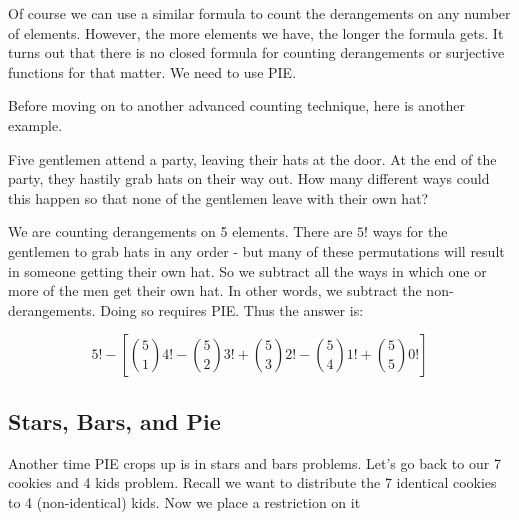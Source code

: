 \documentclass[12pt]{article}
\begin{document}
Of course we can use a similar formula to count the derangements on any number of elements.  However, the more elements we have, the longer the formula gets.  It turns out that there is no closed formula for counting derangements or surjective functions for that matter.  We need to use PIE.  

Before moving on to another advanced counting technique, here is another example.

\begin{example}
  Five gentlemen attend a party, leaving their hats at the door.  At the end of the party, they hastily grab hats on their way out.  How many different ways could this happen so that none of the gentlemen leave with their own hat?
  
  \begin{solution}
    We are counting derangements on 5 elements.  There are $5!$ ways for the gentlemen to grab hats in any order - but many of these permutations will result in someone getting their own hat.  So we subtract all the ways in which one or more of the men get their own hat.  In other words, we subtract the non-derangements. Doing so requires PIE.  Thus the answer is:
    
    \[5! - \left[{5 \choose 1}4! - {5 \choose 2}3! + {5 \choose 3}2! - {5 \choose 4}1! + {5 \choose 5}0!\right]\]
  \end{solution}

\end{example}

\subsection{Stars, Bars, and Pie}

Another time PIE crops up is in stars and bars problems.  Let's go back to our 7 cookies and 4 kids problem.  Recall we want to distribute the 7 identical cookies to 4 (non-identical) kids.  Now we place a restriction on it
\end{document}
